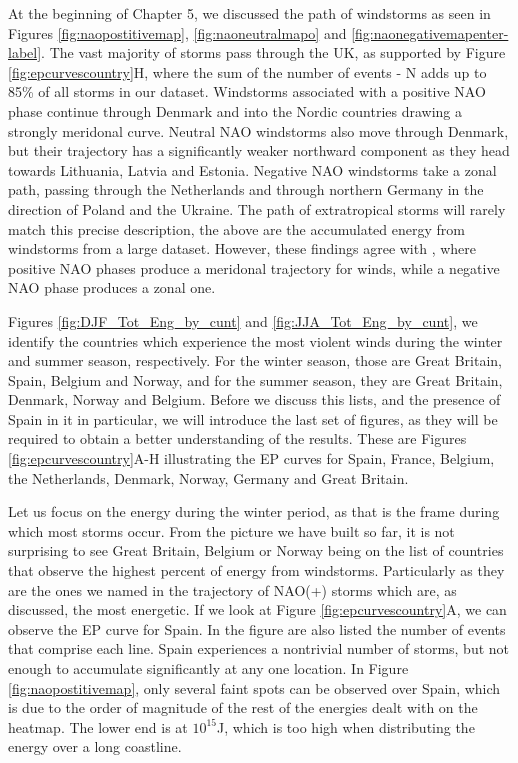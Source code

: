         At the beginning of Chapter 5, we discussed the path of windstorms as seen in Figures \ref{fig:naopostitivemap}, \ref{fig:naoneutralmapo} and \ref{fig:naonegativemapenter-label}. The vast majority of storms pass through the UK, as supported by Figure \ref{fig:epcurvescountry}H, where the sum of the number of events - N adds up to 85\% of all storms in our dataset. Windstorms associated with a positive NAO phase continue through Denmark and into the Nordic countries drawing a strongly meridonal curve. Neutral NAO windstorms also move through Denmark, but their trajectory has a significantly weaker northward component as they head towards Lithuania, Latvia and Estonia. Negative NAO windstorms take a zonal path, passing through the Netherlands and through northern Germany in the direction of Poland and the Ukraine. 
        The path of extratropical storms will rarely match this precise description, the above are the accumulated energy from windstorms from a large dataset. However, these findings agree with \cite{Hurrell2003}, where positive NAO phases produce a meridonal trajectory for winds, while a negative NAO phase produces a zonal one.

        Figures \ref{fig:DJF_Tot_Eng_by_cunt} and \ref{fig:JJA_Tot_Eng_by_cunt}, we identify the countries which experience the most violent winds during the winter and summer season, respectively. For the winter season, those are Great Britain, Spain, Belgium and Norway, and for the summer season, they are Great Britain, Denmark, Norway and Belgium. Before we discuss this lists, and the presence of Spain in it in particular, we will introduce the last set of figures, as they will be required to obtain a better understanding of the results. These are Figures \ref{fig:epcurvescountry}A-H illustrating the EP curves for Spain, France, Belgium, the Netherlands, Denmark, Norway, Germany and Great Britain.

        Let us focus on the energy during the winter period, as that is the frame during which most storms occur. From the picture we have built so far, it is not surprising to see Great Britain, Belgium or Norway being on the list of countries that observe the highest percent of energy from windstorms. Particularly as they are the ones we named in the trajectory of NAO(+) storms which are, as discussed, the most energetic. If we look at Figure \ref{fig:epcurvescountry}A, we can observe the EP curve for Spain. In the figure are also listed the number of events that comprise each line. Spain experiences a nontrivial number of storms, but not enough to accumulate significantly at any one location. In Figure \ref{fig:naopostitivemap}, only several faint spots can be observed over Spain, which is due to the order of magnitude of the rest of the energies dealt with on the heatmap. The lower end is at $10^{15}$J, which is too high when distributing the energy over a long coastline.

